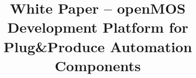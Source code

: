 \title{White Paper – openMOS Development Platform for Plug\&Produce Automation Components}

\author{%
}

\maketitle